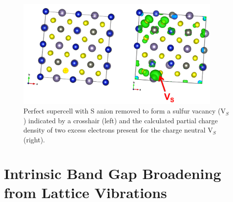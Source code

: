 \begin{figure}[h!]
  \centering
    \includegraphics[width=0.9\textwidth]{figures/V_S-neutral-PARCHG.png}
    \caption{Perfect {\CZTS } supercell with S anion removed to form a sulfur vacancy (V$_S$) indicated by a crosshair (left) and the calculated partial charge density of two excess electrons present for the charge neutral V$_S$ (right).}
  \label{V_S-neutral-PARCHG}
\end{figure}

\section{Intrinsic Band Gap Broadening from Lattice Vibrations}
 
